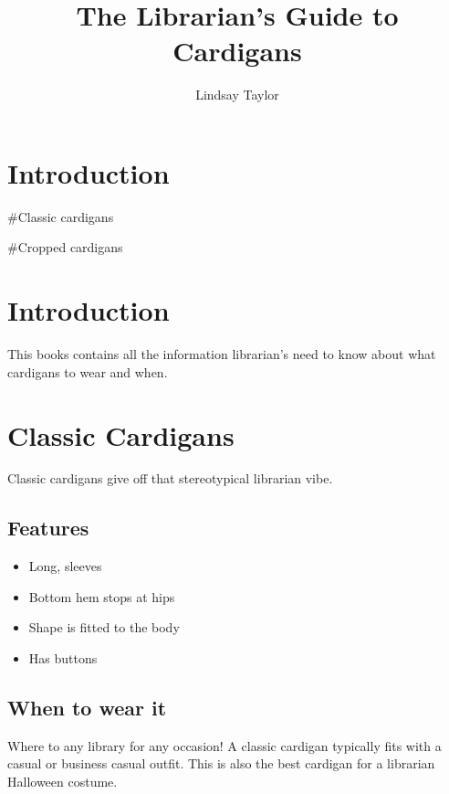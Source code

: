 \documentclass[
  openany]{book}
\title{The Librarian's Guide to Cardigans}
\author{Lindsay Taylor}
\date{}
\providecommand{\tightlist}{%
  \setlength{\itemsep}{0pt}\setlength{\parskip}{0pt}}
\begin{document}
\maketitle

{
\setcounter{tocdepth}{1}
\tableofcontents
}
\hypertarget{introduction}{%
\chapter{Introduction}\label{introduction}}

\#Classic cardigans

\#Cropped cardigans

\hypertarget{introduction-1}{%
\chapter{Introduction}\label{introduction-1}}

This books contains all the information librarian's need to know about what cardigans to wear and when.

\hypertarget{classic-cardigans}{%
\chapter{Classic Cardigans}\label{classic-cardigans}}

Classic cardigans give off that stereotypical librarian vibe.

\hypertarget{features}{%
\section{Features}\label{features}}

\begin{itemize}
\tightlist
\item
  Long, sleeves
\item
  Bottom hem stops at hips
\item
  Shape is fitted to the body
\item
  Has buttons
\end{itemize}

\hypertarget{when-to-wear-it}{%
\section{When to wear it}\label{when-to-wear-it}}

Where to any library for any occasion! A classic cardigan typically fits with a casual or business casual outfit. This is also the best cardigan for a librarian Halloween costume.
\end{document}
